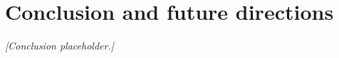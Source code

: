 \section{Conclusion and future directions}
\label{sec:conclusion}


\textit{[Conclusion placeholder.]}
